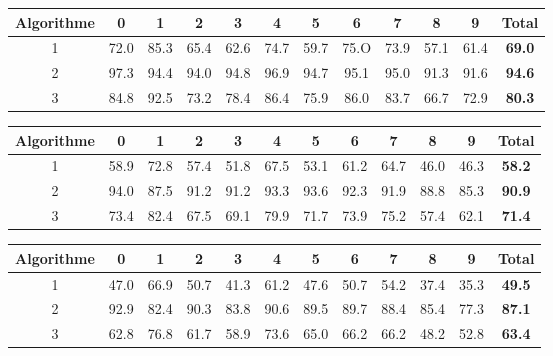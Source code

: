 \documentclass[a4paper,11pt,twoside]{report}
\begin{document}
\begin{center}

\begin{tabular}{ |c||c|c|c|c|c|c|c|c|c|c|c| } 
\hline
 Algorithme & 0 & 1 & 2 & 3 & 4 & 5 & 6 & 7 & 8 & 9 & \textbf{Total} \\ 
  \hline
  \hline
  1 & 72.0 & 85.3 & 65.4 & 62.6 & 74.7 & 59.7 & 75.O & 73.9 & 57.1 & 61.4 & \textbf{69.0} \\
 \hline
  2 & 97.3 & 94.4 & 94.0 & 94.8 & 96.9 & 94.7 & 95.1 & 95.0 & 91.3 & 91.6 & \textbf{94.6} \\
  \hline
  3 & 84.8 & 92.5 & 73.2 & 78.4 & 86.4 & 75.9 & 86.0 & 83.7 & 66.7 & 72.9 & \textbf{80.3} \\
 \hline
\end{tabular}

\begin{tabular}{ |c||c|c|c|c|c|c|c|c|c|c|c| } 
\hline
 Algorithme & 0 & 1 & 2 & 3 & 4 & 5 & 6 & 7 & 8 & 9 & \textbf{Total} \\ 
  \hline
  \hline
  1 & 58.9 & 72.8 & 57.4 & 51.8 & 67.5 & 53.1 & 61.2 & 64.7 & 46.0 & 46.3 & \textbf{58.2} \\
 \hline
  2 & 94.0 & 87.5 & 91.2 & 91.2 & 93.3 & 93.6 & 92.3 & 91.9 & 88.8 & 85.3 & \textbf{90.9} \\
  \hline
  3 & 73.4 & 82.4 & 67.5 & 69.1 & 79.9 & 71.7 & 73.9 & 75.2 & 57.4 & 62.1 & \textbf{71.4} \\
 \hline
\end{tabular}

\begin{tabular}{ |c||c|c|c|c|c|c|c|c|c|c|c| } 
\hline
 Algorithme & 0 & 1 & 2 & 3 & 4 & 5 & 6 & 7 & 8 & 9 & \textbf{Total} \\ 
  \hline
  \hline
 1 & 47.0 & 66.9 & 50.7 & 41.3 & 61.2 & 47.6 & 50.7 & 54.2 & 37.4 & 35.3 & \textbf{49.5} \\
 \hline
 2 & 92.9 & 82.4 & 90.3 & 83.8 & 90.6 & 89.5 & 89.7 & 88.4 & 85.4 & 77.3 & \textbf{87.1} \\
  \hline
 3 & 62.8 & 76.8 & 61.7 & 58.9 & 73.6 & 65.0 & 66.2 & 66.2 & 48.2 & 52.8 & \textbf{63.4} \\
 \hline
\end{tabular}
\end{center}
\end{document}
